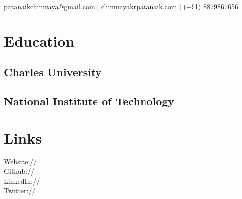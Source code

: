 \documentclass[]{deedy-resume-openfont}
\begin{document}
%
%


{ \href{mailto:patanaikchinmaya@gmail.com}{patanaikchinmaya@gmail.com} | chinmayakrpatanaik.com | (+91) 8879867656}

%
%

\begin{minipage}[t]{0.33\textwidth}


\section{Education}

\subsection{Charles University}
\sectionsep

\subsection{National Institute of Technology}
\sectionsep


\section{Links}
Website:// \href{http://www.chinmayakrpatanaik.com}{} \\
Github:// \href{https://github.com/pattu777}{} \\
LinkedIn://  \href{https://www.linkedin.com/in/chinmayakrpatanaik}{}\\
Twitter://  \href{https://twitter.com/CPatanaik}{}
\sectionsep



\end{minipage}
\end{document}

